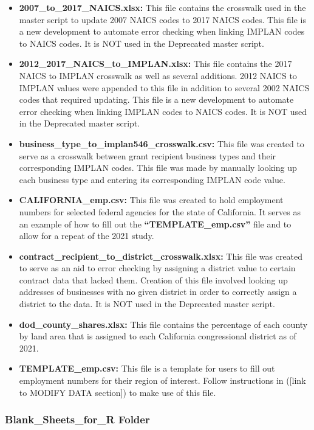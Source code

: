 \documentclass[
]{book}
\providecommand{\tightlist}{%
  \setlength{\itemsep}{0pt}\setlength{\parskip}{0pt}}
\begin{document}
\begin{itemize}
\tightlist
\item
  \textbf{2007\_to\_2017\_NAICS.xlsx:} This file contains the crosswalk used in the master script to update 2007 NAICS codes to 2017 NAICS codes. This file is a new development to automate error checking when linking IMPLAN codes to NAICS codes. It is NOT used in the Deprecated master script.
\item
  \textbf{2012\_2017\_NAICS\_to\_IMPLAN.xlsx:} This file contains the 2017 NAICS to IMPLAN crosswalk as well as several additions. 2012 NAICS to IMPLAN values were appended to this file in addition to several 2002 NAICS codes that required updating. This file is a new development to automate error checking when linking IMPLAN codes to NAICS codes. It is NOT used in the Deprecated master script.
\item
  \textbf{business\_type\_to\_implan546\_crosswalk.csv:} This file was created to serve as a crosswalk between grant recipient business types and their corresponding IMPLAN codes. This file was made by manually looking up each business type and entering its corresponding IMPLAN code value.
\item
  \textbf{CALIFORNIA\_emp.csv:} This file was created to hold employment numbers for selected federal agencies for the state of California. It serves as an example of how to fill out the \textbf{``TEMPLATE\_emp.csv''} file and to allow for a repeat of the 2021 study.\\
\item
  \textbf{contract\_recipient\_to\_district\_crosswalk.xlsx:} This file was created to serve as an aid to error checking by assigning a district value to certain contract data that lacked them. Creation of this file involved looking up addresses of businesses with no given district in order to correctly assign a district to the data. It is NOT used in the Deprecated master script.\\
\item
  \textbf{dod\_county\_shares.xlsx:} This file contains the percentage of each county by land area that is assigned to each California congressional district as of 2021.
\item
  \textbf{TEMPLATE\_emp.csv:} This file is a template for users to fill out employment numbers for their region of interest. Follow instructions in ({[}link to MODIFY DATA section{]}) to make use of this file.
\end{itemize}

\hypertarget{sheets}{%
\subsubsection{Blank\_Sheets\_for\_R Folder}\label{sheets}}
\end{document}
